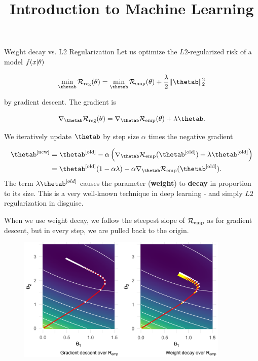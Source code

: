 



\newcommand{\titlefigure}{figure_man/L2-regularization01.png}
\newcommand{\learninggoals}{
  \item Have a geometric understanding of $L2$ regularization
  \item Understand why $L2$ regularization in combination with gradient descent is called weight decay
}

\title{Introduction to Machine Learning}
\date{}






\begin{vbframe}{Weight decay vs. L2 Regularization}
Let us optimize the $L2$-regularized risk of a model $f(x | \theta)$

\[
\min_{\thetab} \riskrt = \min_{\thetab} \risket + \frac{\lambda}{2} \|\thetab\|^2_2
\]

by gradient descent. The gradient is

\[
\nabla_{\thetab} \riskrt = \nabla_{\thetab} \risket + \lambda \thetab.
\]

We iteratively update $\thetab$ by step size \(\alpha\) times the
negative gradient

\begin{align*}
\thetab^{[\text{new}]} &= \thetab^{[\text{old}]} - \alpha \left(\nabla_{\thetab} \riske(\thetab^{[\text{old}]}) + \lambda \thetab^{[\text{old}]}\right) \\&=
\thetab^{[\text{old}]} (1 - \alpha \lambda) - \alpha \nabla_{\thetab} \riske(\thetab^{[\text{old}]}).
\end{align*}
The term \(\lambda \thetab^{[old]}\) causes the parameter
(\textbf{weight}) to \textbf{decay} in proportion to its size. This is a very well-known technique in deep learning - and simply $L2$ regularization in disguise.

\framebreak

When we use weight decay, we follow the steepest slope of $\mathcal{R}_{\text{emp}}$ as for gradient descent, but in every step, we are pulled back to the origin.

\begin{figure}
\includegraphics[width=0.9\textwidth]{figure_man/L2-regularization01.png}\\
\end{figure}



\end{vbframe}
